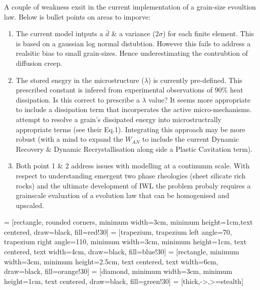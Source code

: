 \documentclass[]{scrreprt}
\begin{document}
A couple of weakness exsit in the current implementation of a grain-size evoultion law. Below is bullet points on areas to imporve:

\begin{enumerate}
\item The current model intputs a $\bar{d}$ \& a variance (2$\sigma$) for each finite element. This is based on a gaussian log normal distubtion. However this fails to address a realsitic bias to small grain-sizes. Hence underestimating the contrubtion of diffusion creep. 
\item The stored enegry in the microstructure ($\lambda$) is currently pre-defined. This prescribed constant is infered from experimental observations of 90\% heat dissipation. Is this correct to prescribe a $\lambda$ value? It seems more appropriate to include a dissipation term that incorperates the active micro-mechanisms. \citet{Huang2009} attempt to resolve a grain's dissipated energy into microstructrally appropriate terms (see their Eq.1). Integrating this approach may be more robust (with a mind to expand the $W_{AN}$ to include the current Dynamic Recovery \& Dynamic Recrystallisation along side a Plastic Cavitation term).
\item Both point 1 \& 2 address issues with modelling at a continumm scale. With respect to understanding emergent two phase rheologies (sheet silicate rich rocks) and the ultimate development of IWL \citep{Handy1994} the problem probaly requires a grainscale evaluation of a evolution law that can be homogenised and upscaled.
\end{enumerate}


 = [rectangle, rounded corners, minimum width=3cm, minimum height=1cm,text centered, draw=black, fill=red!30]
 = [trapezium, trapezium left angle=70, trapezium right angle=110, minimum width=3cm, minimum height=1cm, text centered, text width=4cm, draw=black, fill=blue!30]
 = [rectangle, minimum width=3cm, minimum height=2.5cm, text centered, text width=6cm, draw=black, fill=orange!30]
 = [diamond, minimum width=3cm, minimum height=1cm, text centered, draw=black, fill=green!30]
 = [thick,->,>=stealth]
\end{document}

